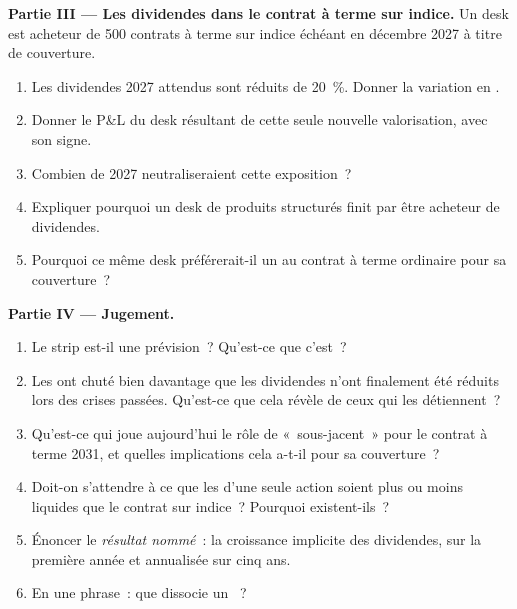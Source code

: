 \begin{problem}
\medskip\noindent\textbf{Partie III --- Les dividendes dans le contrat à terme sur indice.}
Un desk est acheteur de 500 contrats à terme sur indice échéant en décembre 2027 à titre de couverture.
\begin{enumerate}[resume]
\item Les dividendes 2027 attendus sont réduits de 20~\%. Donner la variation en .
\item Donner le P\&L du desk résultant de cette seule nouvelle valorisation, avec son signe.
\item Combien de  2027 neutraliseraient cette exposition~?
\item Expliquer pourquoi un desk de produits structurés finit par être acheteur de dividendes.
\item Pourquoi ce même desk préférerait-il un  au contrat à terme
ordinaire pour sa couverture~?
\end{enumerate}

\medskip\noindent\textbf{Partie IV --- Jugement.}
\begin{enumerate}[resume]
\item Le strip est-il une prévision~? Qu'est-ce que c'est~?
\item Les  ont chuté bien davantage que les dividendes n'ont finalement été réduits
lors des crises passées. Qu'est-ce que cela révèle de ceux qui les détiennent~?
\item Qu'est-ce qui joue aujourd'hui le rôle de «~sous-jacent~» pour le contrat à terme 2031,
et quelles implications cela a-t-il pour sa couverture~?
\item Doit-on s'attendre à ce que les  d'une seule action soient plus
ou moins liquides que le contrat sur indice~? Pourquoi existent-ils~?
\item Énoncer le \emph{résultat nommé}~: la croissance implicite des dividendes, sur la première année
et annualisée sur cinq ans.
\item En une phrase~: que dissocie un ~?
\end{enumerate}
\end{problem}

